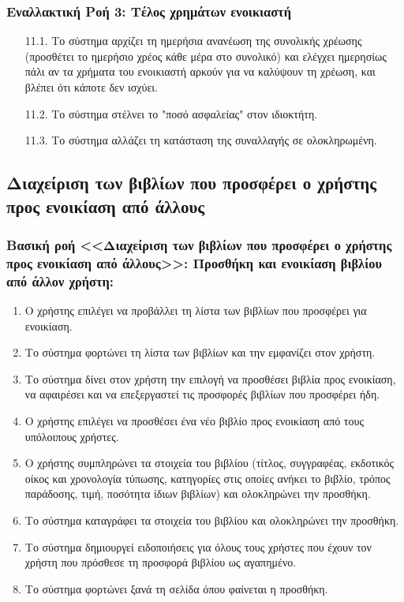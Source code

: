 \documentclass[12pt,a4paper]{article}
\begin{document}
\subsubsection*{Εναλλακτική Ροή 3: Τέλος χρημάτων ενοικιαστή}
\begin{enumerate}
    \item[11.1.] Το σύστημα αρχίζει τη ημερήσια ανανέωση της συνολικής χρέωσης (προσθέτει το ημερήσιο χρέος κάθε μέρα στο συνολικό) και ελέγχει ημερησίως πάλι αν τα χρήματα του ενοικιαστή αρκούν για να καλύψουν τη χρέωση, και βλέπει ότι κάποτε δεν ισχύει.
    \item[11.2.] Το σύστημα στέλνει το "ποσό ασφαλείας" στον ιδιοκτήτη.
    \item[11.3.] Το σύστημα αλλάζει τη κατάσταση της συναλλαγής σε ολοκληρωμένη.
\end{enumerate}

\subsection{Διαχείριση των βιβλίων που προσφέρει ο χρήστης προς ενοικίαση από άλλους}

\subsubsection*{Βασική ροή <<Διαχείριση των βιβλίων που προσφέρει ο χρήστης \\προς ενοικίαση από άλλους>>: Προσθήκη και ενοικίαση βιβλίου από άλλον χρήστη:}
\begin{enumerate}
    \item Ο χρήστης επιλέγει να προβάλλει τη λίστα των βιβλίων που προσφέρει για ενοικίαση.
    \item Το σύστημα φορτώνει τη λίστα των βιβλίων και την εμφανίζει στον χρήστη.
    \item Το σύστημα δίνει στον χρήστη την επιλογή να προσθέσει βιβλία προς ενοικίαση, να αφαιρέσει και να επεξεργαστεί τις προσφορές βιβλίων που προσφέρει ήδη.
    \item Ο χρήστης επιλέγει να προσθέσει ένα νέο βιβλίο προς ενοικίαση από τους υπόλοιπους χρήστες.
    \item Ο χρήστης συμπληρώνει τα στοιχεία του βιβλίου (τίτλος, συγγραφέας, εκδοτικός οίκος και χρονολογία τύπωσης, κατηγορίες στις οποίες ανήκει το βιβλίο, τρόπος παράδοσης, τιμή, ποσότητα ίδιων βιβλίων) και ολοκληρώνει την προσθήκη.
    \item Το σύστημα καταγράφει τα στοιχεία του βιβλίου και ολοκληρώνει την προσθήκη.
    \item Το σύστημα δημιουργεί ειδοποιήσεις για όλους τους χρήστες που έχουν τον χρήστη που πρόσθεσε τη προσφορά βιβλίου ως αγαπημένο.
    \item Το σύστημα φορτώνει ξανά τη σελίδα όπου φαίνεται η προσθήκη.
\end{enumerate}
\end{document}
